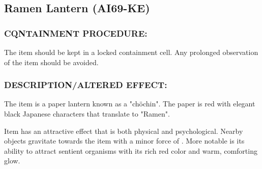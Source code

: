 \subsection*{Ramen Lantern (AI69-KE)}
\subsubsection*{CQNTAINMENT PROCEDURE:}
\par The item should be kept in a locked
containment cell. Any prolonged
observation of the item should be
avoided.
\subsubsection*{DESCRIPTION/ALTERED EFFECT:}
\par The item is a paper lantern known as a
"chöchin". The paper is red with elegant
black Japanese characters that translate to "Ramen".
\par Item has an attractive effect that is both physical and
psychological. Nearby objects gravitate towards the item with a
minor force of . More notable is its ability to attract
sentient organisms with its rich red color and warm, comforting
glow.